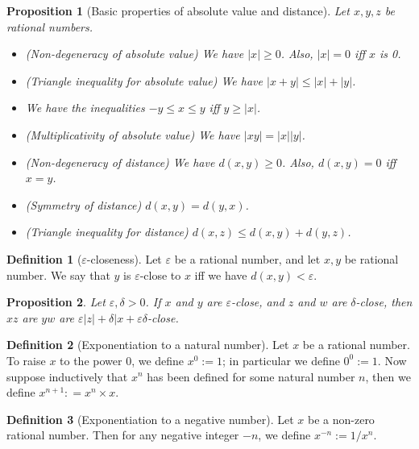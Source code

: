 \documentclass[
]{book}
\providecommand{\tightlist}{%
  \setlength{\itemsep}{0pt}\setlength{\parskip}{0pt}}
\newtheorem{proposition}{Proposition}[chapter]
\theoremstyle{definition}
\newtheorem{definition}{Definition}[chapter]
\theoremstyle{definition}
\theoremstyle{definition}
\theoremstyle{definition}
\theoremstyle{remark}
\begin{document}
\begin{proposition}[Basic properties of absolute value and distance]

Let \(x,y,z\) be rational numbers.

\begin{itemize}
\tightlist
\item
  (Non-degeneracy of absolute value) We have \(|x|\geq 0\). Also, \(|x| = 0\) iff \(x\) is 0.
\item
  (Triangle inequality for absolute value) We have \(|x+y|\leq |x|+|y|\).
\item
  We have the inequalities \(-y\leq x\leq y\) iff \(y\geq |x|\).
\item
  (Multiplicativity of absolute value) We have \(|xy|=|x||y|\).
\item
  (Non-degeneracy of distance) We have \(d(x,y)\geq 0\). Also, \(d(x,y)=0\) iff \(x=y\).
\item
  (Symmetry of distance) \(d(x,y)=d(y,x)\).
\item
  (Triangle inequality for distance) \(d(x,z)\leq d(x,y)+d(y,z)\).
\end{itemize}

\end{proposition}

\begin{definition}[$\varepsilon$-closeness]
Let \(\varepsilon\) be a rational number, and let \(x,y\) be rational number. We say that \(y\) is \(\varepsilon\)-close to \(x\) iff we have \(d(x,y)<\varepsilon\).
\end{definition}

\begin{proposition}
Let \(\varepsilon,\delta>0\). If \(x\) and \(y\) are \(\varepsilon\)-close, and \(z\) and \(w\) are \(\delta\)-close, then \(xz\) are \(yw\) are \(\varepsilon|z|+\delta|x+\varepsilon\delta\)-close.
\end{proposition}

\begin{definition}[Exponentiation to a natural number]
Let \(x\) be a rational number. To raise \(x\) to the power \(0\), we define \(x^0:=1\); in particular we define \(0^0:=1\). Now suppose inductively that \(x^n\) has been defined for some natural number \(n\), then we define \(x^{n+1} : = x^n\times x\).
\end{definition}

\begin{definition}[Exponentiation to a negative number]
Let \(x\) be a non-zero rational number. Then for any negative integer \(-n\), we define \(x^{-n} := 1/x^n\).
\end{definition}
\end{document}
